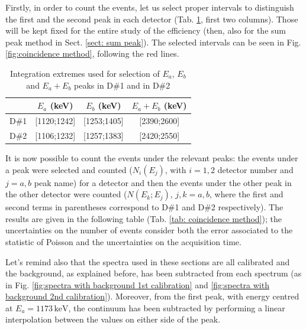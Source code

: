 \documentclass[a4paper]{article}
\begin{document}
Firstly, in order to count the events, let us select proper intervals to distinguish the first and the second peak in each detector (Tab. \ref{tab:integration limits}, first two columns). Those will be kept fixed for the entire study of the efficiency (then, also for the sum peak method in Sect. \ref{sect: sum peak}). The selected intervals can be seen in Fig. \ref{fig:coincidence method}, following the red lines.
\begin{table}[H]
    \centering
    \begin{tabular}{|l|ccc|}
    \hline
       & $E_a$ (keV) & $E_b$ (keV) & $E_a+E_b$ (keV)\\
       \hline
       D\#1 & [1120;1242] & [1253;1405] & [2390;2600]\\
       D\#2 & [1106;1232] & [1257;1383] & [2420;2550]\\
       \hline
    \end{tabular}
    \caption{Integration extremes used for selection of $E_a$, $E_b$ and $E_a+E_b$ peaks in D\#1 and in D\#2}
    \label{tab:integration limits}
\end{table}

It is now possible to count the events under the relevant peaks: the events under a peak were selected and counted ($N_i(E_j)$, with $i=1,2$ detector number and $j=a,b$ peak name) for a detector and then the events under the other peak in the other detector were counted ($N(E_k;E_j)$, $j,k=a,b$, where the first and second terms in parentheses correspond to D\#1 and D\#2 respectively). %
The results are given in the following table (Tab. \ref{tab: coincidence method}); the uncertainties on the number of events consider both the error associated to the statistic of Poisson and the uncertainties on the acquisition time.

Let's remind also that the spectra used in these sections are all calibrated and the background, as explained before, has been subtracted from each spectrum (as in Fig. \ref{fig:spectra with background 1st calibration} and \ref{fig:spectra with background 2nd calibration}).  Moreover, from the first peak, with energy centred at $E_a=1173\,\mathrm{keV}$, the continuum has been subtracted by performing a linear interpolation between the values on either side of the peak. %
\end{document}
